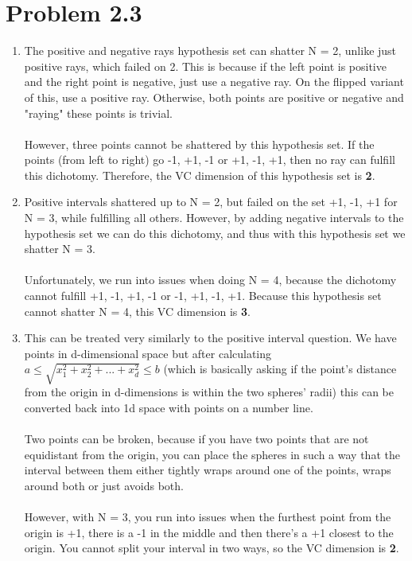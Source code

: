 \documentclass[12pt]{article}
\begin{document}
\section*{Problem 2.3}
\begin{enumerate}[label=(\alph*)]
	\item The positive and negative rays hypothesis set can shatter N = 2, unlike just positive rays, which failed on 2. This is because if the left point is positive and the right point is negative, just use a negative ray. On the flipped variant of this, use a positive ray. Otherwise, both points are positive or negative and "raying" these points is trivial.
	\\ \\ However, three points cannot be shattered by this hypothesis set. If the points (from left to right) go -1, +1, -1 or +1, -1, +1, then no ray can fulfill this dichotomy. Therefore, the VC dimension of this hypothesis set is \textbf{2}.
	\item Positive intervals shattered up to N = 2, but failed on the set +1, -1, +1 for N = 3, while fulfilling all others. However, by adding negative intervals to the hypothesis set we can do this dichotomy, and thus with this hypothesis set we shatter N = 3.
	\\ \\ Unfortunately, we run into issues when doing N = 4, because the dichotomy cannot fulfill +1, -1, +1, -1 or -1, +1, -1, +1. Because this hypothesis set cannot shatter N = 4, this VC dimension is \textbf{3}.
	\item This can be treated very similarly to the positive interval question. We have points in d-dimensional space but after calculating 
	\\ $a \le \sqrt{x_1^2 + x_2^2 + ... + x_d^2} \le b$ (which is basically asking if the point's distance from the origin in d-dimensions is within the two spheres' radii) this can be converted back into 1d space with points on a number line.
	\\ \\ Two points can be broken, because if you have two points that are not equidistant from the origin, you can place the spheres in such a way that the interval between them either tightly wraps around one of the points, wraps around both or just avoids both.
	\\ \\ However, with N = 3, you run into issues when the furthest point from the origin is +1, there is a -1 in the middle and then there's a +1 closest to the origin. You cannot split your interval in two ways, so the VC dimension is \textbf{2}.
\end{enumerate}
\end{document}
